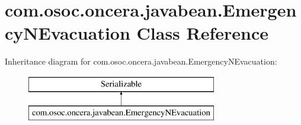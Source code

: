 \hypertarget{classcom_1_1osoc_1_1oncera_1_1javabean_1_1_emergency_n_evacuation}{}\section{com.\+osoc.\+oncera.\+javabean.\+Emergency\+N\+Evacuation Class Reference}
\label{classcom_1_1osoc_1_1oncera_1_1javabean_1_1_emergency_n_evacuation}
Inheritance diagram for com.\+osoc.\+oncera.\+javabean.\+Emergency\+N\+Evacuation\+:\begin{figure}[H]
\begin{center}
\leavevmode
\includegraphics[height=2.000000cm]{classcom_1_1osoc_1_1oncera_1_1javabean_1_1_emergency_n_evacuation}
\end{center}
\end{figure}
